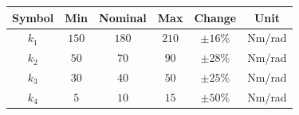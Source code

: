 \begin{tabular}{c|c|c|c|c|c}
    Symbol & Min & Nominal & Max & Change & Unit \\
    \hline
    $k_1$ & $150$ & $180$ & $210$ & $\pm16$\% & Nm/rad \\
    $k_2$ & $50$  & $70$  & $90$  & $\pm28$\% & Nm/rad \\
    $k_3$ & $30$  & $40$  & $50$  & $\pm25$\% & Nm/rad \\
    $k_4$ & $5$   & $10$  & $15$  & $\pm50$\% & Nm/rad 
\end{tabular}

